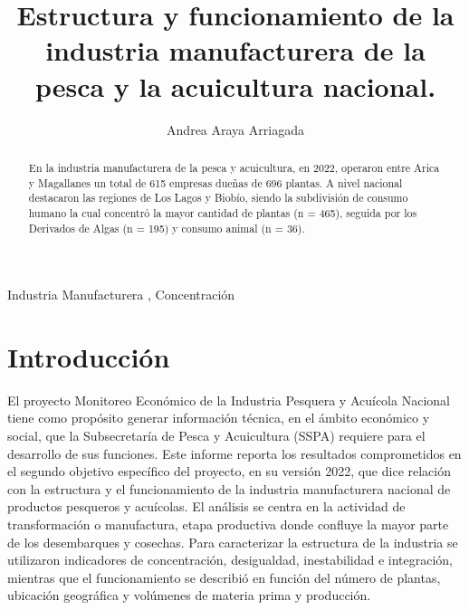 \documentclass[
  super,
  preprint,
  3p]{elsarticle}
\begin{document}
\begin{frontmatter}
\title{Estructura y funcionamiento de la industria manufacturera de la
pesca y la acuicultura nacional.}
\author[1]{Andrea Araya Arriagada%
%
}



        
\begin{abstract}
En la industria manufacturera de la pesca y acuicultura, en 2022,
operaron entre Arica y Magallanes un total de 615 empresas dueñas de 696
plantas. A nivel nacional destacaron las regiones de Los Lagos y Biobío,
siendo la subdivisión de consumo humano la cual concentró la mayor
cantidad de plantas (n = 465), seguida por los Derivados de Algas (n =
195) y consumo animal (n = 36).
\end{abstract}





\begin{keyword}
    Industria Manufacturera \sep 
    Concentración
\end{keyword}
\end{frontmatter}
    \ifdefined\Shaded\renewenvironment{Shaded}{\begin{tcolorbox}[boxrule=0pt, interior hidden, frame hidden, borderline west={3pt}{0pt}{shadecolor}, breakable, enhanced, sharp corners]}{\end{tcolorbox}}\fi

\hypertarget{introducciuxf3n}{%
\section{Introducción}\label{introducciuxf3n}}

El proyecto Monitoreo Económico de la Industria Pesquera y Acuícola
Nacional tiene como propósito generar información técnica, en el ámbito
económico y social, que la Subsecretaría de Pesca y Acuicultura (SSPA)
requiere para el desarrollo de sus funciones. Este informe reporta los
resultados comprometidos en el segundo objetivo específico del proyecto,
en su versión 2022, que dice relación con la estructura y el
funcionamiento de la industria manufacturera nacional de productos
pesqueros y acuícolas. El análisis se centra en la actividad de
transformación o manufactura, etapa productiva donde confluye la mayor
parte de los desembarques y cosechas. Para caracterizar la estructura de
la industria se utilizaron indicadores de concentración, desigualdad,
inestabilidad e integración, mientras que el funcionamiento se describió
en función del número de plantas, ubicación geográfica y volúmenes de
materia prima y producción.
\end{document}
